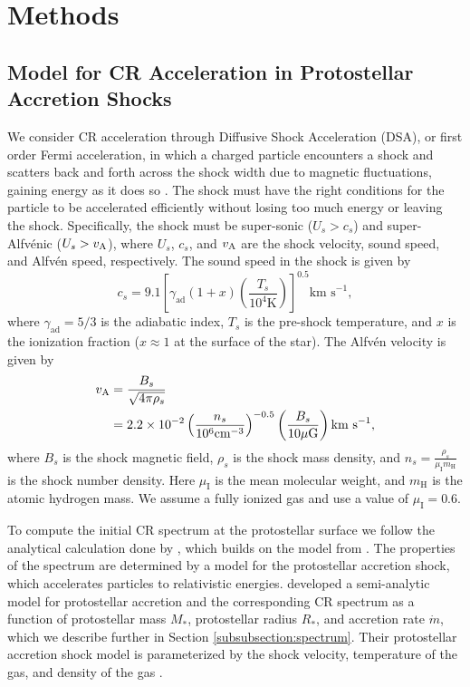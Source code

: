 \documentclass[twocolumn]{aastex63}
\def\lp{\left(}
\def\rp{\right)}
\def\lb{\left[}
\def\rb{\right]}
\def\t{\text}
\begin{document}
\section{Methods}
\label{section:methods}


\subsection{Model for CR Acceleration in Protostellar Accretion Shocks}
\label{subsection:model}

We consider CR acceleration through Diffusive Shock Acceleration (DSA), or first order Fermi acceleration, in which a charged particle encounters a shock and scatters back and forth across the shock width due to magnetic fluctuations, gaining energy as it does so \citep{drury_1983_dsa}. The shock must have the right conditions for the particle to be accelerated efficiently without losing too much energy or leaving the shock. Specifically, the shock must be super-sonic ($U_s>c_s$) and super-Alfv\'enic ($U_s>v_{\rm A}$), where $U_s$, $c_s$, and $v_{\rm A}$ are the shock velocity, sound speed, and Alfv\'en speed, respectively. The sound speed in the shock is given by \citep{padovani_2019_synchrotron}
\begin{equation}
    c_s=9.1\lb\gamma_{\t{ad}}(1+x)\lp\frac{T_s}{10^4 \t{K}}\rp\rb^{0.5} \t{km s}^{-1}, 
\end{equation}
where $\gamma_{\t{ad}}=5/3$ is the adiabatic index, $T_s$ is the pre-shock temperature, and $x$ is the ionization fraction ($x \approx 1$ at the surface of the star). The Alfv\'en velocity is given by 
\begin{align}
v_{\rm A} &= \frac{B_s}{\sqrt{4\pi\rho_s}} \nonumber \\
       &=2.2\times10^{-2}\lp \frac{n_s}{10^6 \t{cm}^{-3}}\rp^{-0.5}\lp\frac{B_s}{10 \mu \t{G}}\rp \t{km s}^{-1},
\end{align}
where $B_s$ is the shock magnetic field, $\rho_s$ is the shock mass density, and  $n_s=\frac{\rho_s}{\mu_{\t{I}}m_{\t{H}}}$ is the shock number density. Here  $\mu_{\t{I}}$ is the mean molecular weight, and $m_{\t{H}}$ is the atomic hydrogen mass. We assume a fully ionized gas and use a value of $\mu_{\t{I}}=0.6$. 

To compute the initial CR spectrum at the protostellar surface we follow the analytical calculation done by \cite{gaches_2018_exploration},
which builds on the model from \cite{padovani_2016_protostars}. The properties of the spectrum are determined by a model for the protostellar accretion shock, which accelerates particles to relativistic energies. \cite{gaches_2018_exploration} developed a semi-analytic model for protostellar accretion and the corresponding CR spectrum as a function of protostellar mass $M_*$, protostellar radius $R_*$, and accretion rate $\dot{m}$, which we describe further in Section \ref{subsubsection:spectrum}. Their protostellar accretion shock model is parameterized by the shock velocity, temperature of the gas, and density of the gas \citep{hartmann_2016_accretion}. 
\end{document}
